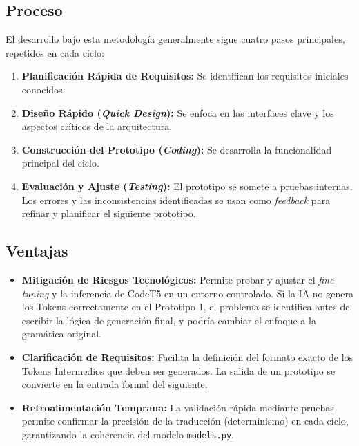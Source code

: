 \subsection{Proceso}
\label{subsec:prototipos-proceso}

El desarrollo bajo esta metodología generalmente sigue cuatro pasos principales, repetidos en cada ciclo:

\begin{enumerate}
    \item \textbf{Planificación Rápida de Requisitos:} Se identifican los requisitos iniciales conocidos.
    \item \textbf{Diseño Rápido (\textit{Quick Design}):} Se enfoca en las interfaces clave y los aspectos críticos de la arquitectura.
    \item \textbf{Construcción del Prototipo (\textit{Coding}):} Se desarrolla la funcionalidad principal del ciclo.
    \item \textbf{Evaluación y Ajuste (\textit{Testing}):} El prototipo se somete a pruebas internas. Los errores y las inconsistencias identificadas se usan como \textit{feedback} para refinar y planificar el siguiente prototipo.
\end{enumerate}

\subsection{Ventajas}
\label{subsec:prototipos-ventajas}

\begin{itemize}
    \item \textbf{Mitigación de Riesgos Tecnológicos:} Permite probar y ajustar el \textit{fine-tuning} y la inferencia de CodeT5 en un entorno controlado. Si la IA no genera los Tokens correctamente en el Prototipo 1, el problema se identifica antes de escribir la lógica de generación final, y podría cambiar el enfoque a la gramática original.
    \item \textbf{Clarificación de Requisitos:} Facilita la definición del formato exacto de los Tokens Intermedios que deben ser generados. La salida de un prototipo se convierte en la entrada formal del siguiente.
    \item \textbf{Retroalimentación Temprana:} La validación rápida mediante pruebas permite confirmar la precisión de la traducción (determinismo) en cada ciclo, garantizando la coherencia del modelo \texttt{models.py}.
\end{itemize}

